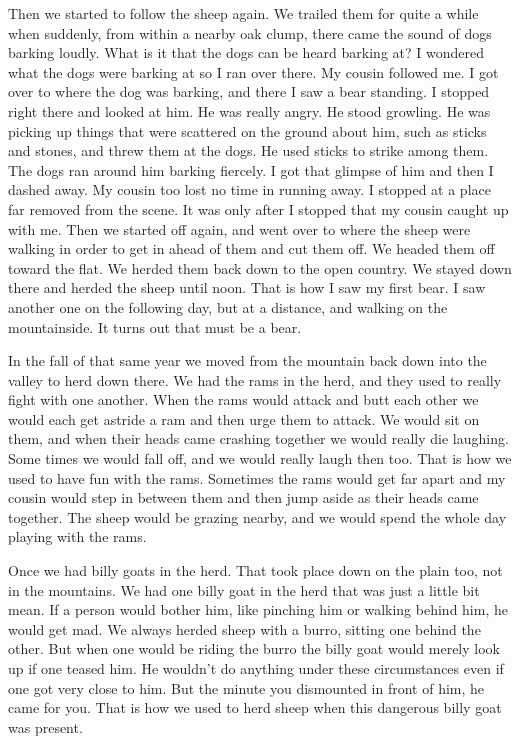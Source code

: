 Then we started to follow the sheep again. We trailed them for quite a while when suddenly, from within a nearby oak clump, there came the sound of dogs barking loudly. What is it that the dogs can be heard barking at? I wondered what the dogs were barking at so I ran over there. My cousin followed me. I got over to where the dog was barking, and there I saw a bear standing. I stopped right there and looked at him. He was really angry. He stood growling. He was picking up things that were scattered on the ground about him, such as sticks and stones, and threw them at the dogs. He used sticks to strike among them. The dogs ran around him barking fiercely. I got that glimpse of him and then I dashed away. My cousin too lost no time in running away. I stopped at a place far removed from the scene. It was only after I stopped that my cousin caught up with me. Then we started off again, and went over to where the sheep were walking in order to get in ahead of them and cut them off. We headed them off toward the flat. We herded them back down to the open country. We stayed down there and herded the sheep until noon. That is how I saw my first bear. I saw another one on the following day, but at a distance, and walking on the mountainside. It turns out that must be a bear.

In the fall of that same year we moved from the mountain back down into the valley to herd down there. We had the rams in the herd, and they used to really fight with one another. When the rams would attack and butt each other we would each get astride a ram and then urge them to attack. We would sit on them, and when their heads came crashing together we would really die laughing. Some times we would fall off, and we would really laugh then too. That is how we used to have fun with the rams. Sometimes the rams would get far apart and my cousin would step in between them and then jump aside as their heads came together. The sheep would be grazing nearby, and we would spend the whole day playing with the rams.

Once we had billy goats in the herd. That took place down on the plain too, not in the mountains. We had one billy goat in the herd that was just a little bit mean. If a person would bother him, like pinching him or walking behind him, he would get mad. We always herded sheep with a burro, sitting one behind the other. But when one would be riding the burro the billy goat would merely look up if one teased him. He wouldn't do anything under these circumstances even if one got very close to him. But the minute you dismounted in front of him, he came for you. That is how we used to herd sheep when this dangerous billy goat was present.

